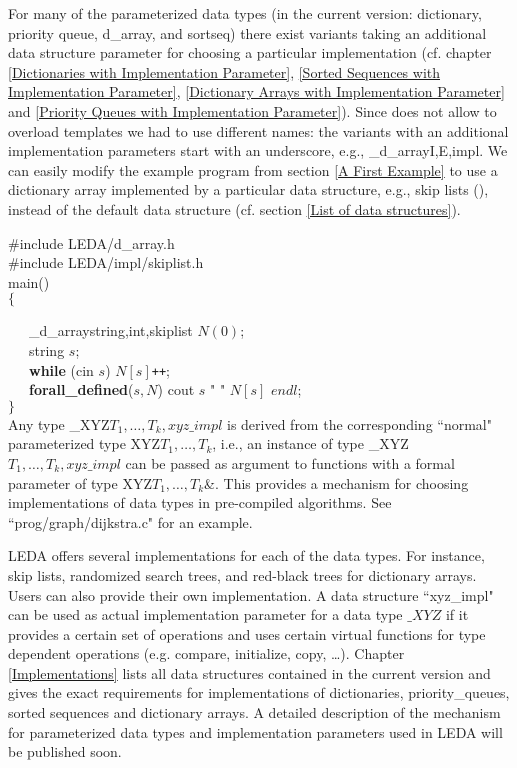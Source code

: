 \label{Implementation Parameters}
For many of the parameterized data types (in the current version: dictionary, 
priority queue, d\_array, and sortseq) there exist variants taking an additional
data structure parameter for choosing a particular implementation 
(cf. chapter \ref{Dictionaries with Implementation Parameter},
\ref{Sorted Sequences with Implementation Parameter},
\ref{Dictionary Arrays with Implementation Parameter}
and \ref{Priority Queues with Implementation Parameter}). Since \CC
does not
allow to overload templates we had 
to use different names: the variants with an additional implementation 
parameters start with an underscore, e.g., \_d\_array\<I,E,impl\>. 
We can easily modify the example program from section \ref{A First Example} 
to use a dictionary 
array implemented by a particular data structure, e.g., skip lists (\cite{Pu90}), 
instead of the default data structure (cf. section \ref{List of data structures}). 
\medskip

\#include \<LEDA/d\_array.h\>\\
\#include \<LEDA/impl/skiplist.h\>\\
\smallskip
main()\\
$\{$

\ \ \ \_d\_array\<string,int,skiplist\> $N(0)$;\\
\smallskip
\ \ \ string $s$;\\
\smallskip
\ \ \ {\bf while} (cin \>\> $s$) $N[s]${\tt ++};\\
\smallskip
\ \ \ {\bf forall\_defined}($s,N$) 
                cout \<\< $s$ \<\< " " \<\< $N[s]$ \<\< $endl$;\\
\smallskip
$\}$\\

Any type \_XYZ\<$T_1,\dots,T_k,xyz\_impl$\> is derived from the corresponding
``normal" parameterized type XYZ\<$T_1,\dots,T_k$\>, i.e., an instance of type 
\_XYZ\<$T_1,\dots,T_k,xyz\_impl$\> can be passed as argument to functions with
a formal parameter of type XYZ\<$T_1,\dots,T_k$\>\&. 
This provides a mechanism
for choosing implementations of data types in pre-compiled algorithms.
See ``prog/graph/dijkstra.c" for an example.

LEDA offers several implementations for each of the data types. For
instance, skip lists, randomized search trees, and red-black trees
for dictionary arrays. Users can also provide their own implementation. 
A data structure ``xyz\_impl" can be used as actual
implementation parameter for a data type $\_XYZ$ if it provides a 
certain set of operations and uses certain virtual functions for type 
dependent operations (e.g. compare, initialize, copy, \dots).
Chapter \ref{Implementations} lists all data structures contained in the current version and 
gives the exact requirements for implementations of 
dictionaries, priority\_queues, sorted sequences and dictionary arrays.
A detailed description of the mechanism for parameterized data types and 
implementation parameters used in LEDA will be published soon.


